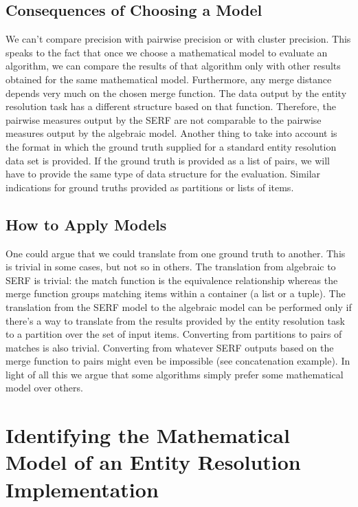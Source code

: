 \documentclass[11pt]{article}
\begin{document}
    \subsection[why-bother]{Consequences of Choosing a Model}\label{subsec:why-bother}

    We can't compare precision with pairwise precision or with cluster precision. This speaks to the fact that once we choose a mathematical model to evaluate an algorithm, we can compare the results of that algorithm only with other results obtained for the same mathematical model. Furthermore, any merge distance depends very much on the chosen merge function. The data output by the entity resolution task has a different structure based on that function. Therefore, the pairwise measures output by the SERF are not comparable to the pairwise measures output by the algebraic model. Another thing to take into account is the format in which the ground truth supplied for a standard entity resolution data set is provided. If the ground truth is provided as a list of pairs, we will have to provide the same type of data structure for the evaluation. Similar indications for ground truths provided as partitions or lists of items.

    \subsection[applying]{How to Apply Models}\label{sub-sec:applying}

    One could argue that we could translate from one ground truth to another. This is trivial in some cases, but not so in others. The translation from algebraic to SERF is trivial: the match function is the equivalence relationship whereas the merge function groups matching items within a container (a list or a tuple). The translation from the SERF model to the algebraic model can be performed only if there's a way to translate from the results provided by the entity resolution task to a partition over the set of input items. Converting from partitions to pairs of matches is also trivial. Converting from whatever SERF outputs based on the merge function to pairs might even be impossible (see concatenation example). In light of all this we argue that some algorithms simply prefer some mathematical model over others.

    \section{Identifying the Mathematical Model of an Entity Resolution Implementation}\label{section:implementation}
    
\end{document}
